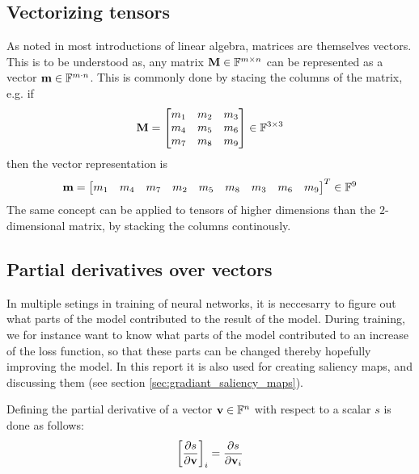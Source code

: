\subsection{Vectorizing tensors}
As noted in most introductions of linear algebra, matrices are themselves vectors.
This is to be understood as, any matrix $\textbf{M} \in \mathbb{F}^{m\times n}$ can be represented as a vector $\textbf{m} \in \mathbb{F}^{m\cdot n}$.
This is commonly done by stacing the columns of the matrix, e.g.  if
\begin{equation}
    \textbf{M} = \begin{bmatrix}
        m_1 & m_2 & m_3 \\
        m_4 & m_5 & m_6 \\
        m_7 & m_8 & m_9
    \end{bmatrix} \in \mathbb{F}^{3 \times 3}
\end{equation}
then the vector representation is
\begin{equation}
    \textbf{m} = \begin{bmatrix}
        m_1 & m_4 & m_7 & m_2 & m_5 & m_8 & m_3 & m_6 & m_9
    \end{bmatrix}^T \in \mathbb{F}^{9}
\end{equation}
The same concept can be applied to tensors of higher dimensions than the $2$-dimensional matrix,
by stacking the columns continously.

\subsection{Partial derivatives over vectors} \label{sec:partial_derivatives_of_scalar_over_vector}
In multiple setings in training of neural networks, it is neccesarry to figure out what
parts of the model contributed to the result of the model.
During training, we for instance want to know what parts of the model contributed to an increase of the loss function,
so that these parts can be changed thereby hopefully improving the model.
In this report it is also used for creating saliency maps, and discussing them (see section \ref{sec:gradiant_saliency_maps}).

Defining the partial derivative of a vector $\textbf{v}\in\mathbb{F}^n$ with respect to a scalar $s$ is done as follows:
\begin{equation}
    \left[ \frac{\partial s}{\partial \textbf{v}} \right]_i
    = \frac{\partial s}{\partial \textbf{v}_i}
\end{equation}

